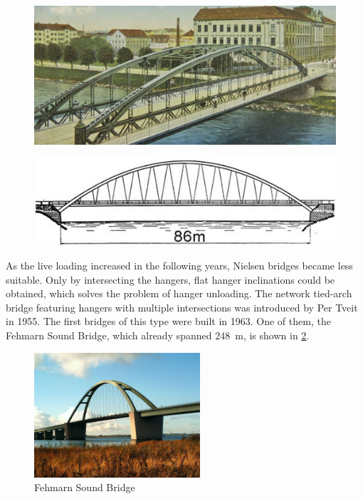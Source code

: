 \begin{figure}[H]
\centering
\begin{minipage}{.5\textwidth}
  \centering
  \includegraphics[width=.9\textwidth]{overleaf/Pictures/langerscher balken.PNG}
  \label{fig:langerscherbalken}
\end{minipage}%
\begin{minipage}{.5\textwidth}
  \centering
  \vspace*{0.6cm}
  \includegraphics[width=.9\textwidth]{overleaf/Pictures/Nielsen bridge.png}
  \vspace*{0.6cm}
  \label{fig:nielsenbridge}
\end{minipage}
\end{figure}

As the live loading increased in the following years, Nielsen bridges became less suitable. Only by intersecting the hangers, flat hanger inclinations could be obtained, which solves the problem of hanger unloading. The network tied-arch bridge featuring hangers with multiple intersections was introduced by Per Tveit in 1955. The first bridges of this type were built in 1963. One of them, the Fehmarn Sound Bridge, which already spanned \SI{248}{m}, is shown in \cref{fig:Fehmarnsundbrcke}.

\begin{figure}[H]
    \centering
    \includegraphics[trim={0 1.5cm 0 0.7cm},clip, width=0.55\textwidth]{overleaf/Pictures/Fehmarnsund.jpg}
    \caption{Fehmarn Sound Bridge \cite{Fehmarnsund}}
    \label{fig:Fehmarnsundbrcke}
\end{figure}

